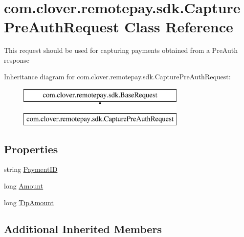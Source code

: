 \hypertarget{classcom_1_1clover_1_1remotepay_1_1sdk_1_1_capture_pre_auth_request}{}\section{com.\+clover.\+remotepay.\+sdk.\+Capture\+Pre\+Auth\+Request Class Reference}
\label{classcom_1_1clover_1_1remotepay_1_1sdk_1_1_capture_pre_auth_request}


This request should be used for capturing payments obtained from a Pre\+Auth response  


Inheritance diagram for com.\+clover.\+remotepay.\+sdk.\+Capture\+Pre\+Auth\+Request\+:\begin{figure}[H]
\begin{center}
\leavevmode
\includegraphics[height=2.000000cm]{classcom_1_1clover_1_1remotepay_1_1sdk_1_1_capture_pre_auth_request}
\end{center}
\end{figure}
\subsection*{Properties}
\begin{DoxyCompactItemize}
\item 
string \hyperlink{classcom_1_1clover_1_1remotepay_1_1sdk_1_1_capture_pre_auth_request_a3a7fb8ce574a713d201a3d218f2199fd}{Payment\+ID}
\item 
long \hyperlink{classcom_1_1clover_1_1remotepay_1_1sdk_1_1_capture_pre_auth_request_a4ae0d0f91cf6dbca14b63a47e2e841b0}{Amount}
\item 
long \hyperlink{classcom_1_1clover_1_1remotepay_1_1sdk_1_1_capture_pre_auth_request_a5a34025a2bb189f2458ea17796565fe7}{Tip\+Amount}
\end{DoxyCompactItemize}
\subsection*{Additional Inherited Members}


